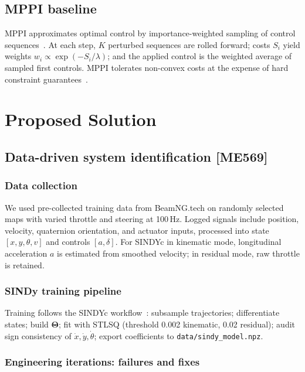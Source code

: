 \documentclass[letterpaper, 10 pt, conference]{ieeeconf}  %
\begin{document}
\subsection{MPPI baseline}

MPPI approximates optimal control by importance-weighted sampling of control sequences~\cite{Williams2016MPPI,Williams2017MPPI}.
At each step, $K$ perturbed sequences are rolled forward; costs $S_i$ yield weights $w_i \propto \exp(-S_i / \lambda)$; and the applied control is the weighted average of sampled first controls.
MPPI tolerates non-convex costs at the expense of hard constraint guarantees~\cite{Williams2016MPPI,Hewing2020}.

\section{Proposed Solution}

\subsection{Data-driven system identification [ME569]}

\subsubsection{Data collection}
We used pre-collected training data from BeamNG.tech on randomly selected maps with varied throttle and steering at 100\,Hz.
Logged signals include position, velocity, quaternion orientation, and actuator inputs, processed into state $[x, y, \theta, v]$ and controls $[a, \delta]$. 
For SINDYc in kinematic mode, longitudinal acceleration $a$ is estimated from smoothed velocity; in residual mode, raw throttle is retained.

\subsubsection{SINDy training pipeline}
Training follows the SINDYc workflow~\cite{Brunton2016SINDYc}: subsample trajectories; differentiate states; build $\boldsymbol{\Theta}$; fit with STLSQ (threshold 0.002 kinematic, 0.02 residual); audit sign consistency of $\dot{x}, \dot{y}, \dot{\theta}$; export coefficients to \texttt{data/sindy\_model.npz}.

\subsubsection{Engineering iterations: failures and fixes}
\end{document}
